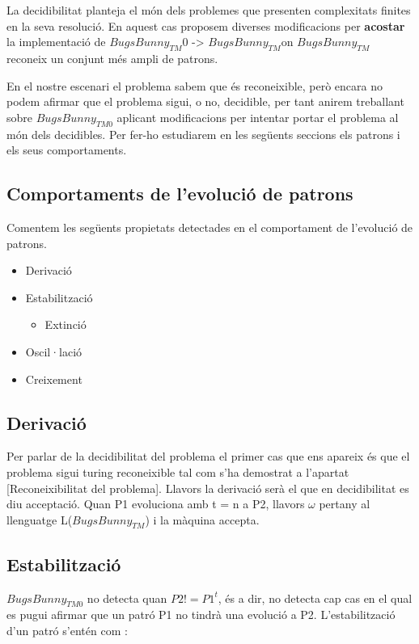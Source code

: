 \documentclass[12pt,a4paper]{report}
\def \w{$\omega$}
\def \tm{$BugsBunny_{TM} $}
\def \tmz{$BugsBunny_{TM0} $}
\begin{document}
La decidibilitat planteja el món dels problemes que presenten complexitats finites en la seva resolució. En aquest cas proposem diverses modificacions per \textbf{acostar} la implementació de \tm0{} -> \tm on \tm{} reconeix un conjunt més ampli de patrons.

En el nostre escenari el problema sabem que és reconeixible, però encara no podem afirmar que el problema sigui, o no, decidible, per tant anirem treballant sobre \tmz{} aplicant modificacions per intentar portar el problema al món dels decidibles. Per fer-ho estudiarem en les següents seccions els patrons i els seus comportaments.

\subsection{Comportaments de l’evolució de patrons}

Comentem les següents propietats detectades en el comportament de l’evolució de patrons.

\begin{itemize}
\item Derivació
\item Estabilització
	\begin{itemize}
	\item Extinció
	\end{itemize}
\item Oscil·lació
\item Creixement
\end{itemize}

\subsection{Derivació}

Per parlar de la decidibilitat del problema el primer cas que ens apareix és que el problema sigui turing reconeixible tal com s’ha demostrat a l’apartat [Reconeixibilitat del problema]. Llavors la derivació serà el que en decidibilitat es diu acceptació. Quan P1 evoluciona amb t = n a P2, llavors \w{} pertany al llenguatge L(\tm{}) i la màquina accepta.

\subsection{Estabilització}

\tmz{} no detecta quan $P2 != P1^t$, és a dir, no detecta cap cas en el qual es pugui afirmar que un patró P1 no tindrà una evolució a P2. L’estabilització d’un patró s’entén com :
\end{document}
